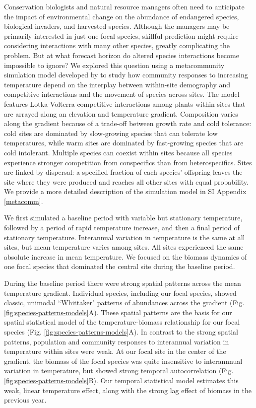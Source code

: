 \documentclass[11pt]{article}
\begin{document}
Conservation biologists and natural resource managers often need to anticipate the impact of environmental change on the abundance of 
endangered species, biological invaders, and harvested species. Although the managers may be primarily interested in just one focal species, skillful prediction might require considering interactions with many other species, greatly complicating the problem. But at what forecast horizon do altered species interactions become impossible to ignore? We explored this question using a metacommunity simulation model developed by \cite{alexander_lags_2018} to study how community responses to increasing temperature depend on the interplay between within-site demography and competitive interactions and the movement of species across sites. The model features Lotka-Volterra competitive interactions among plants within sites that are arrayed along an elevation and temperature gradient. Composition varies along the gradient because of a trade-off between growth rate and cold tolerance: cold sites are dominated by slow-growing species that can tolerate low temperatures, while warm sites are dominated by  fast-growing species that are cold intolerant. Multiple species can coexist within sites because all species experience stronger competition from conspecifics than from heterospecifics. Sites are linked by dispersal: a specified fraction of each species' offspring leaves the site where they were produced and reaches all other sites with equal probability. We provide a more detailed description of the simulation model in SI Appendix \ref{metacomm}.

We first simulated a baseline period with variable but stationary temperature, followed by a period of rapid temperature increase, and then a final period of stationary temperature. Interannual variation in temperature is the same at all sites, but mean temperature varies among sites. All sites experienced the same absolute increase in mean temperature. We focused on the biomass dynamics of one focal species that dominated the central site during the baseline period.

During the baseline period there were strong spatial patterns across the mean temperature gradient. 
Individual species, including our focal species, showed classic, unimodal ``Whittaker" patterns of abundances across the gradient (Fig. \ref{fig:species-patterns-models}A).
These spatial patterns are the basis for our spatial statistical model of the temperature-biomass relationship for our focal species (Fig. \ref{fig:species-patterns-models}A). 
In contrast to the strong spatial patterns, population and community responses to interannual variation in temperature within sites were weak.
At our focal site in the center of the gradient, the biomass of the focal species was quite insensitive to interannnual variation in temperature, but showed strong temporal autocorrelation (Fig. \ref{fig:species-patterns-models}B). Our temporal statistical model estimates this weak, linear temperature effect, along with the strong lag effect of biomass in the previous year. 
\end{document}
